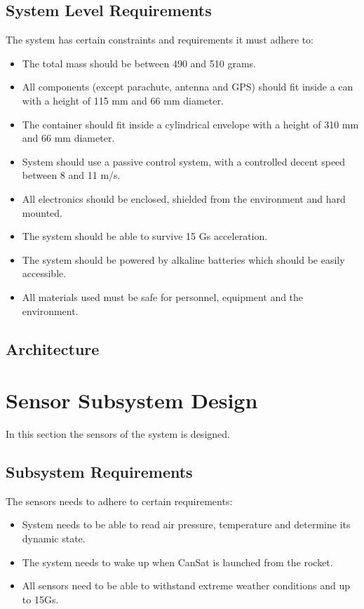 \documentclass[10pt]{article}
\begin{document}
\subsection{System Level Requirements}
The system has certain constraints and requirements it must adhere to:
\begin{itemize}
    \item The total mass should be between 490 and 510 grams.
    \item All components (except parachute, antenna and GPS) should fit inside a can with a height of 115 mm and 66 mm diameter.
    \item The container should fit inside a cylindrical envelope with a height of 310 mm and 66 mm diameter.
    \item System should use a passive control system, with a controlled decent speed between 8 and 11 m/s.
    \item All electronics should be enclosed, shielded from the environment and hard mounted.
    \item The system should be able to survive 15 Gs acceleration.
    \item The system should be powered by alkaline batteries which should be easily accessible.
    \item All materials used must be safe for personnel, equipment and the environment. 
\end{itemize}

\subsection{Architecture}

\newpage

\section{Sensor Subsystem Design}
In this section the sensors of the system is designed.
\subsection{Subsystem Requirements}
The sensors needs to adhere to certain requirements:
\begin{itemize}
    \item System needs to be able to read air pressure, temperature and determine its dynamic state.
    \item The system needs to wake up when CanSat is launched from the rocket.
    \item All sensors need to be able to withstand extreme weather conditions and up to 15Gs.
\end{itemize}
\end{document}
